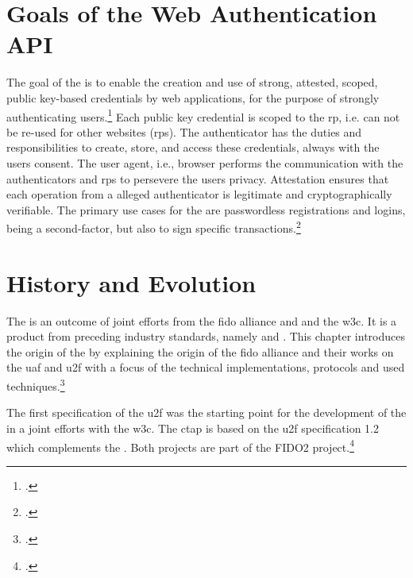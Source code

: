 
\section{Goals of the Web Authentication API}

The goal of the \wa{} is to enable \frqq the creation and use of strong, attested, scoped, public key-based credentials by web applications, for the purpose of strongly authenticating users\flqq.\footcites[][Abstract]{w3c} Each public key credential is scoped to the \gls{rp}, i.e. can not be re-used for other websites (\glspl{rp}). The authenticator has the 	duties and responsibilities to create, store, and access these credentials, always with the users consent. The user agent, i.e., browser performs the communication with the authenticators and \glspl{rp} to persevere the users privacy. Attestation ensures that each operation from a alleged authenticator is legitimate and cryptographically verifiable. The primary use cases for the \wa{} are passwordless registrations and logins, being a second-factor, but also to sign specific transactions.\footcites[See][Abstract, Chapter 1.2]{w3c}

\section{History and Evolution}

The \wa{} is an outcome of joint efforts from the \gls{fido} alliance and and the \gls{w3c}. It is a product from preceding industry standards, namely  and . This chapter introduces the origin of the \wa{} by explaining the origin of the \gls{fido} alliance and their works on the \gls{uaf} and \gls{u2f} with a focus of the technical implementations, protocols and used techniques.\footcites[See][24]{fido-ct-3}

The first specification of the \gls{u2f} was the starting point for the development of the \wa{} in a joint efforts with the \gls{w3c}. The \gls{ctap} is based on the \gls{u2f} specification 1.2 which complements the \wa. Both projects are part of the FIDO2 project.\footcite[See][169--170]{grimes2017hacking}
